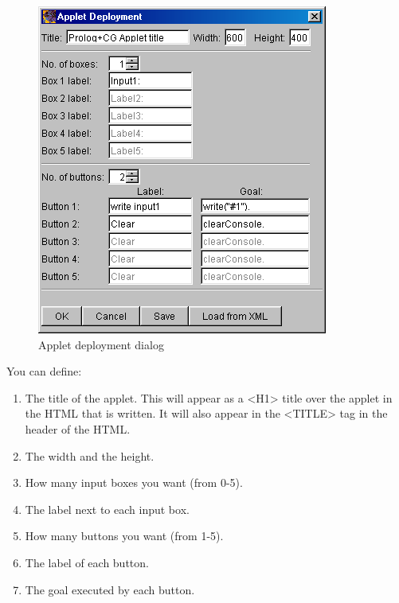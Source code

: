 \documentclass{book}
\begin{document}
\begin{htmlonly}

\begin{figure}
\begin{center}
\includegraphics{AppletDeploymentDialog.png}
\end{center}
\caption{\label{AppletDeploymentDialog}Applet deployment dialog}
\end{figure}

\end{htmlonly}



You can define:

\begin{enumerate}

  \item The title of the applet.  This will appear as a <H1> title
  over the applet in the HTML that is written.  It will also appear in
  the <TITLE> tag in the header of the HTML.

  \item The width and the height.

  \item How many input boxes you want (from 0-5).

  \item The label next to each input box.

  \item How many buttons you want (from 1-5).

  \item The label of each button.

  \item The goal executed by each button.

\end{enumerate}
\end{document}
